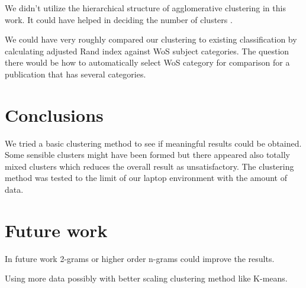 We didn't utilize the hierarchical structure of agglomerative 
clustering in this work. 
It could have helped in deciding the number of clusters \cite{kimes_statistical_2017}.

We could have very roughly compared our clustering to existing 
classification by calculating adjusted Rand index against WoS 
subject categories.
The question there would be how to automatically select WoS 
category for comparison for a publication that has several 
categories.

\section*{Conclusions}
\label{sec:conclusions}
We tried a basic clustering method to see if meaningful results
could be obtained. Some sensible clusters might have been formed 
but there appeared also totally mixed clusters which reduces the 
overall result as unsatisfactory.
The clustering method was tested to the limit of our laptop 
environment with the amount of data.


\section*{Future work}
\label{sec:future}
In future work 2-grams or higher order n-grams could improve the 
results.

Using more data possibly with better scaling clustering method like 
K-means.
